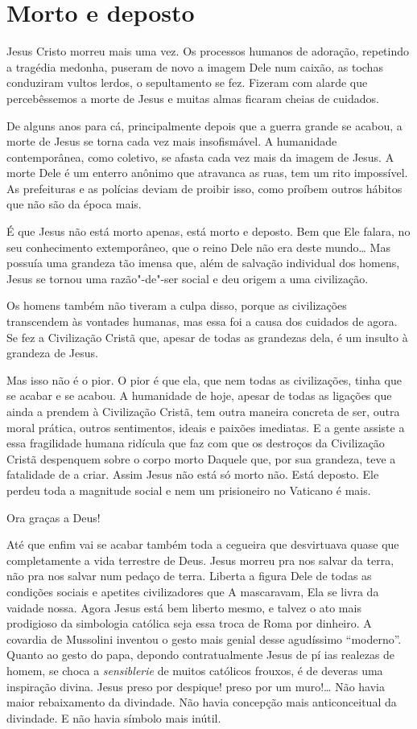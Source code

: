 \chapter{Morto e deposto}

Jesus Cristo morreu mais uma vez. Os processos humanos de adoração,
repetindo a tragédia medonha, puseram de novo a imagem Dele num caixão,
as tochas conduziram vultos lerdos, o sepultamento se fez. Fizeram com
alarde que percebêssemos a morte de Jesus e muitas almas ficaram cheias
de cuidados.

De alguns anos para cá, principalmente depois que a guerra grande se
acabou, a morte de Jesus se torna cada vez mais insofismável. A
humanidade contemporânea, como coletivo, se afasta cada vez mais da
imagem de Jesus. A morte Dele é um enterro anônimo que atravanca as
ruas, tem um rito impossível. As prefeituras e as polícias deviam de
proibir isso, como proíbem outros hábitos que não são da época mais.

É que Jesus não está morto apenas, está morto e deposto. Bem que Ele
falara, no seu conhecimento extemporâneo, que o reino Dele não era deste
mundo\ldots{} Mas possuía uma grandeza tão imensa que, além de salvação
individual dos homens, Jesus se tornou uma razão"-de"-ser social e deu
origem a uma civilização.

Os homens também não tiveram a culpa disso, porque as civilizações
transcendem às vontades humanas, mas essa foi a causa dos cuidados de
agora. Se fez a Civilização Cristã que, apesar de todas as grandezas
dela, é um insulto à grandeza de Jesus.

Mas isso não é o pior. O pior é que ela, que nem todas as civilizações,
tinha que se acabar e se acabou. A humanidade de hoje, apesar de todas
as ligações que ainda a prendem à Civilização Cristã, tem outra maneira
concreta de ser, outra moral prática, outros sentimentos, ideais e
paixões imediatas. E a gente assiste a essa fragilidade humana ridícula
que faz com que os destroços da Civilização Cristã despenquem sobre o
corpo morto Daquele que, por sua grandeza, teve a fatalidade de a criar.
Assim Jesus não está só morto não. Está deposto. Ele perdeu toda a
magnitude social e nem um prisioneiro no Vaticano é mais.

Ora graças a Deus!

Até que enfim vai se acabar também toda a cegueira que desvirtuava quase
que completamente a vida terrestre de Deus. Jesus morreu pra nos salvar
da terra, não pra nos salvar num pedaço de terra. Liberta a figura Dele
de todas as condições sociais e apetites civilizadores que A mascaravam,
Ela se livra da vaidade nossa. Agora Jesus está bem liberto mesmo, e
talvez o ato mais prodigioso da simbologia católica seja essa troca de
Roma por dinheiro. A covardia de Mussolini inventou o gesto mais genial
desse agudíssimo ``moderno''. Quanto ao gesto do papa, depondo
contratualmente Jesus de pí ias realezas de homem, se choca a
\emph{sensiblerie} de muitos católicos frouxos, é de deveras uma
inspiração divina. Jesus preso por despique! preso por um muro!\ldots{} Não
havia maior rebaixamento da divindade. Não havia concepção mais
anticonceitual da divindade. E não havia símbolo mais inútil.

